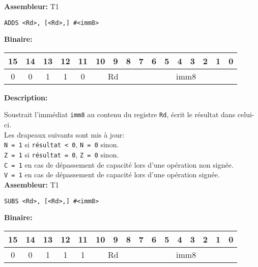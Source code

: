 \documentclass{article}
\begin{document}
    \textbf{Assembleur:} T1

    \begin{lstlisting}
ADDS <Rd>, [<Rd>,] #<imm8>
    \end{lstlisting}

    \textbf{Binaire:}

    \begin{tabular}{| c c c c c c c c c c c c c c c c |}
        \hline
        15 & 14 & 13 & \multicolumn{1}{|c}{12} & 11 & \multicolumn{1}{|c}{10} & 9 & 8 & \multicolumn{1}{|c}{7} & 6 & 5 & 4 & 3 & 2 & 1 & 0 \\
        \hline
        0 & 0 & 1 & \multicolumn{1}{|c}{1} & 0 & \multicolumn{3}{|c|}{Rd} & \multicolumn{8}{|c|}{imm8} \\
        \hline
    \end{tabular}
    

    \textbf{Description: }

    Soustrait l'immédiat \texttt{imm8} au contenu du registre \texttt{Rd}, écrit le résultat dans celui-ci.\\
    Les drapeaux suivants sont mis à jour:\\
    \texttt{N = 1} si \texttt{résultat < 0}, \texttt{N = 0} sinon.\\
    \texttt{Z = 1} si \texttt{résultat = 0}, \texttt{Z = 0} sinon.\\
    \texttt{C = 1} en cas de dépassement de capacité lors d'une opération non signée.\\
    \texttt{V = 1} en cas de dépassement de capacité lors d'une opération signée.\\

    \textbf{Assembleur:} T1

    \begin{lstlisting}
SUBS <Rd>, [<Rd>,] #<imm8>
    \end{lstlisting}

    \textbf{Binaire:}

    \begin{tabular}{| c c c c c c c c c c c c c c c c |}
        \hline
        15 & 14 & 13 & \multicolumn{1}{|c}{12} & 11 & \multicolumn{1}{|c}{10} & 9 & 8 & \multicolumn{1}{|c}{7} & 6 & 5 & 4 & 3 & 2 & 1 & 0 \\
        \hline
        0 & 0 & 1 & \multicolumn{1}{|c}{1} & 1 & \multicolumn{3}{|c|}{Rd} & \multicolumn{8}{|c|}{imm8} \\
        \hline
    \end{tabular}
\end{document}
